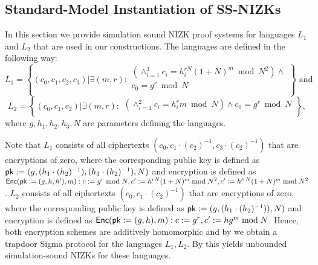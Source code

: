 \subsection{Standard-Model Instantiation of SS-NIZKs}\label{sec:nizk-crs}
In this section we provide simulation sound NIZK proof systems for languages $L_1$ and $L_2$ that are used in our constructions. The languages are defined in the following way:  
\[
L_1 = \left\{(c_0, c_1, c_2, c_3)| \exists (m,r):
\begin{aligned}
       (\land_{i=1}^3 c_i = h_i^{rN}(1+N)^m \bmod N^2) \land \\
       c_0 = g^r \bmod N\\
    \end{aligned}
    \right\} \text{ and } 
\]
\[
L_2 = \left\{(c_0, c_1, c_2)| \exists (m,r):
\begin{aligned}
       (\land_{i=1}^2 c_i = h_i^{r}m \bmod N) \land
       c_0 = g^r \bmod N\\
    \end{aligned}
    \right\},   
\]
where $g, h_1, h_2, h_3, N$ are parameters defining the languages. 

Note that $L_1$ consists of all ciphertexts $(c_0, c_1\cdot (c_2)^{-1}, c_3\cdot (c_2)^{-1})$ that are encryptions of zero, where the corresponding public key is defined as $\mathsf{pk}:=(g, (h_1\cdot (h_2)^{-1}), (h_3\cdot (h_2)^{-1}), N)$ and encryption is defined as $\mathsf{Enc}(\mathsf{pk}:=(g,h,h'),m): c:=g^r \bmod N, c':=h^{rN}(1+N)^m \bmod N^2, c':=h'^{rN}(1+N)^m \bmod N^2$. $L_2$ consists of all ciphertexts $(c_0, c_1\cdot (c_2)^{-1})$ that are encryptions of zero, where the corresponding public key is defined as $\mathsf{pk}:=(g, (h_1\cdot (h_2)^{-1})), N)$ and encryption is defined as $\mathsf{Enc}(\mathsf{pk}:=(g,h),m): c:=g^r, c':=hg^m \bmod N$. Hence, both encryption schemes are additively homomorphic and by  we obtain a trapdoor Sigma protocol for the languages $L_1, L_2$. By  this yields unbounded simulation-sound NIZKs for these languages.









